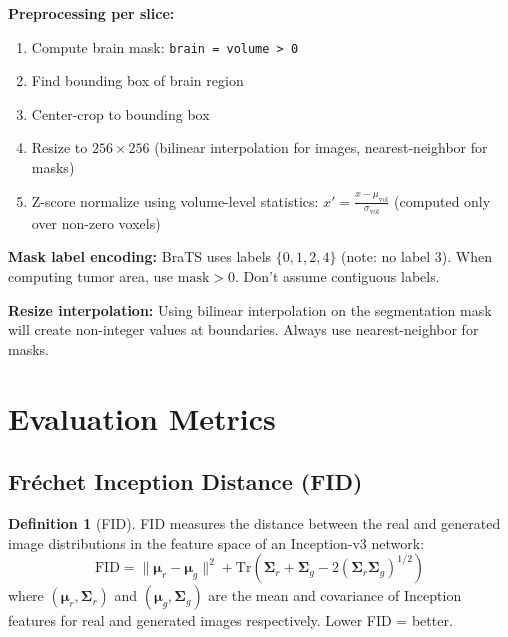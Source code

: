 \documentclass[11pt,a4paper]{article}
\theoremstyle{definition}
\newtheorem{definition}{Definition}[section]
\begin{document}
\textbf{Preprocessing per slice:}
\begin{enumerate}
    \item Compute brain mask: \texttt{brain = volume > 0}
    \item Find bounding box of brain region
    \item Center-crop to bounding box
    \item Resize to $256 \times 256$ (bilinear interpolation for images, nearest-neighbor for masks)
    \item Z-score normalize using volume-level statistics: $x' = \frac{x - \mu_{\text{vol}}}{\sigma_{\text{vol}}}$ (computed only over non-zero voxels)
\end{enumerate}

\begin{edgecase}
\textbf{Mask label encoding:} BraTS uses labels $\{0, 1, 2, 4\}$ (note: no label 3). When computing tumor area, use $\text{mask} > 0$. Don't assume contiguous labels.

\vspace{0.3em}
\textbf{Resize interpolation:} Using bilinear interpolation on the segmentation mask will create non-integer values at boundaries. Always use nearest-neighbor for masks.
\end{edgecase}

\section{Evaluation Metrics}

\subsection{Fr\'echet Inception Distance (FID)}

\begin{definition}[FID]
FID measures the distance between the real and generated image distributions in the feature space of an Inception-v3 network:
\begin{equation}
    \text{FID} = \|\bm{\mu}_r - \bm{\mu}_g\|^2 + \text{Tr}\left(\bm{\Sigma}_r + \bm{\Sigma}_g - 2(\bm{\Sigma}_r \bm{\Sigma}_g)^{1/2}\right)
\end{equation}
where $(\bm{\mu}_r, \bm{\Sigma}_r)$ and $(\bm{\mu}_g, \bm{\Sigma}_g)$ are the mean and covariance of Inception features for real and generated images respectively. Lower FID = better.
\end{definition}
\end{document}
